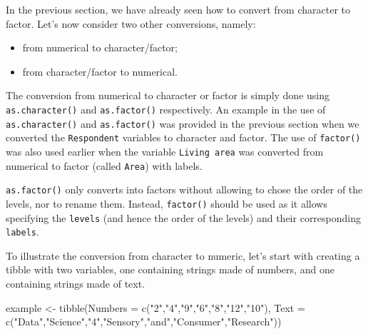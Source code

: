 \documentclass[
]{krantz}
\makeatletter
\newenvironment{Shaded}{\begin{snugshade}}{\end{snugshade}}
\newcommand{\AttributeTok}[1]{\textcolor[rgb]{0.61,0.61,0.61}{#1}}
\newcommand{\FunctionTok}[1]{\textcolor[rgb]{0,0,0}{#1}}
\newcommand{\NormalTok}[1]{#1}
\newcommand{\OtherTok}[1]{\textcolor[rgb]{0.37,0.37,0.37}{#1}}
\newcommand{\StringTok}[1]{\textcolor[rgb]{0.5,0.5,0.5}{#1}}
\providecommand{\tightlist}{%
  \setlength{\itemsep}{0pt}\setlength{\parskip}{0pt}}
\renewenvironment{quote}{\begin{VF}}{\end{VF}}
\newenvironment{kframe}{%
\medskip{}
\setlength{\fboxsep}{.8em}
 \def\at@end@of@kframe{}%
 \ifinner\ifhmode%
  \def\at@end@of@kframe{\end{minipage}}%
  \begin{minipage}{\columnwidth}%
 \fi\fi%
 \def\FrameCommand##1{\hskip\@totalleftmargin \hskip-\fboxsep
 \colorbox{shadecolor}{##1}\hskip-\fboxsep
     \hskip-\linewidth \hskip-\@totalleftmargin \hskip\columnwidth}%
 \MakeFramed {\advance\hsize-\width
   \@totalleftmargin\z@ \linewidth\hsize
   \@setminipage}}%
 {\par\unskip\endMakeFramed%
 \at@end@of@kframe}
\renewenvironment{Shaded}{\begin{kframe}}{\end{kframe}}
\makeatother
\begin{document}
In the previous section, we have already seen how to convert from character to factor. Let's now consider two other conversions, namely:

\begin{itemize}
\tightlist
\item
  from numerical to character/factor;
\item
  from character/factor to numerical.
\end{itemize}

The conversion from numerical to character or factor is simply done using \texttt{as.character()} and \texttt{as.factor()} respectively. An example in the use of \texttt{as.character()} and \texttt{as.factor()} was provided in the previous section when we converted the \texttt{Respondent} variables to character and factor. The use of \texttt{factor()} was also used earlier when the variable \texttt{Living\ area} was converted from numerical to factor (called \texttt{Area}) with labels.

\begin{quote}
\texttt{as.factor()} only converts into factors without allowing to chose the order of the levels, nor to rename them. Instead, \texttt{factor()} should be used as it allows specifying the \texttt{levels} (and hence the order of the levels) and their corresponding \texttt{labels}.
\end{quote}

To illustrate the conversion from character to numeric, let's start with creating a tibble with two variables, one containing strings made of numbers, and one containing strings made of text.

\begin{Shaded}
\begin{Highlighting}[]
\NormalTok{example }\OtherTok{\textless{}{-}} \FunctionTok{tibble}\NormalTok{(}\AttributeTok{Numbers =} \FunctionTok{c}\NormalTok{(}\StringTok{"2"}\NormalTok{,}\StringTok{"4"}\NormalTok{,}\StringTok{"9"}\NormalTok{,}\StringTok{"6"}\NormalTok{,}\StringTok{"8"}\NormalTok{,}\StringTok{"12"}\NormalTok{,}\StringTok{"10"}\NormalTok{),}
                  \AttributeTok{Text =} \FunctionTok{c}\NormalTok{(}\StringTok{"Data"}\NormalTok{,}\StringTok{"Science"}\NormalTok{,}\StringTok{"4"}\NormalTok{,}\StringTok{"Sensory"}\NormalTok{,}\StringTok{"and"}\NormalTok{,}\StringTok{"Consumer"}\NormalTok{,}\StringTok{"Research"}\NormalTok{))}
\end{Highlighting}
\end{Shaded}
\end{document}
